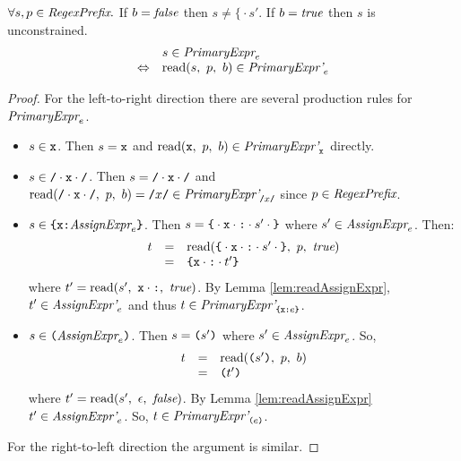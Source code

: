 \documentclass[preprint,10pt]{sigplanconf}
\begin{document}
\begin{lemma}\mbox{}
  
  \( \forall s, p \in \textit{RegexPrefix}. \)
  If \( b = \textit{false} \) then \( s \not = \texttt{\{} \cdot s' \). If \(
  b = \textit{true} \) then \( s \) is unconstrained.
  \[ 
  \begin{array}{rl}
  &s \in \textit{PrimaryExpr}_{e} 
  \\
  \Leftrightarrow &
  \textrm{read}(s,~p,~b) \in \textit{PrimaryExpr'}_{e} 
  \end{array}
  \]
\end{lemma}
\begin{proof}
  For the left-to-right direction there are several production rules for
  \( \textit{PrimaryExpr}_{e} \).
  \begin{itemize}
  \item \( s \in \texttt{x} \). Then \( s
    = \texttt{x} \) and \( \textrm{read}(\texttt{x},~p,~b) \in
    \textit{PrimaryExpr'}_{\texttt{x}} \) directly.

  \item \( s \in \texttt{/} \cdot \texttt{x} \cdot \texttt{/} \). Then \( s
    = \texttt{/} \cdot \texttt{x} \cdot \texttt{/} \) and \( \textrm{read}(\texttt{/} \cdot \texttt{x} \cdot \texttt{/},~p,~b) = \texttt{/}x\texttt{/} \in
    \textit{PrimaryExpr'}_{\texttt{/}x\texttt{/}} \) since \( p \in \textit{RegexPrefix} \).

  \item \( s \in \texttt{\{}\texttt{x}\texttt{:} \textit{AssignExpr}_{e}\texttt{\}} \).
    Then \( s = \texttt{\{} \cdot \texttt{x} \cdot \texttt{:} \cdot 
    s' \cdot \texttt{\}} \) where \(
    s' \in \textit{AssignExpr}_{e} \). Then:
    \[
    \begin{array}{rcl}
      t &=& \textrm{read}(\texttt{\{} \cdot \texttt{x}\cdot  
        \texttt{:} \cdot s' \cdot \texttt{\}},~p,~\textit{true})
      \\
      &=& \texttt{\{}\texttt{x} \cdot \texttt{:} \cdot t'\texttt{\}}
    \end{array}
    \]
    where \( t' = \textrm{read}(s',~\texttt{x} \cdot \texttt{:},~\textit{true}) \). By Lemma
    \ref{lem:readAssignExpr}, \( t' \in
    \textit{AssignExpr'}_{e} \) and thus \( t \in
    \textit{PrimaryExpr'}_{\texttt{\{}\texttt{x}\texttt{:}e\texttt{\}}} \).
    
  \item \( s \in \texttt{(}\textit{AssignExpr}_{e}\texttt{)} \). Then \( s = \texttt{(}s'\texttt{)} \)
    where \( s' \in \textit{AssignExpr}_{e} \). So,
    \[
    \begin{array}{rcl}
      t &=& \textrm{read}(\texttt{(}s'\texttt{)},~p,~b)
      \\
      &=& \texttt{(}t'\texttt{)}
    \end{array}
    \]
    where \( t' = \textrm{read}(s',~\epsilon,~\textit{false}) \). By Lemma
    \ref{lem:readAssignExpr} \( t' \in
    \textit{AssignExpr'}_{e} \). So, \( t \in
    \textit{PrimaryExpr'}_{\texttt{(}e\texttt{)}} \).
  \end{itemize}
  
  For the right-to-left direction the argument is similar.
\end{proof}
\end{document}
